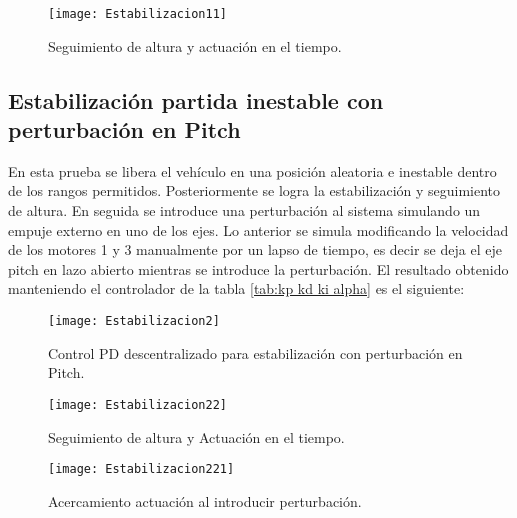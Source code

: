 \documentclass[../main.tex]{subfiles}
\begin{document}
\begin{figure}[H]
\noindent \begin{centering}
\texttt{[image: Estabilizacion11]}
\par\end{centering}
\caption{Seguimiento de altura y actuación en el tiempo.}
\end{figure}

\subsection{Estabilización partida inestable con perturbación en Pitch}

En esta prueba se libera el vehículo en una posición aleatoria e inestable
dentro de los rangos permitidos. Posteriormente se logra la estabilización
y seguimiento de altura. En seguida se introduce una perturbación
al sistema simulando un empuje externo en uno de los ejes. Lo anterior
se simula modificando la velocidad de los motores 1 y 3 manualmente
por un lapso de tiempo, es decir se deja el eje pitch en lazo abierto
mientras se introduce la perturbación. El resultado obtenido manteniendo
el controlador de la tabla \ref{tab:kp kd ki alpha} es el siguiente:

\begin{figure}[H]
\noindent \begin{centering}
\texttt{[image: Estabilizacion2]}
\par\end{centering}
\caption{Control PD descentralizado para estabilización con perturbación en Pitch.}
\end{figure}

\begin{figure}[H]
\noindent \begin{centering}
\texttt{[image: Estabilizacion22]}
\par\end{centering}
\caption{Seguimiento de altura y Actuación en el tiempo.}
\end{figure}

\begin{figure}[H]
\noindent \begin{centering}
\texttt{[image: Estabilizacion221]}
\par\end{centering}
\caption{Acercamiento actuación al introducir perturbación.}
\end{figure}
\end{document}
